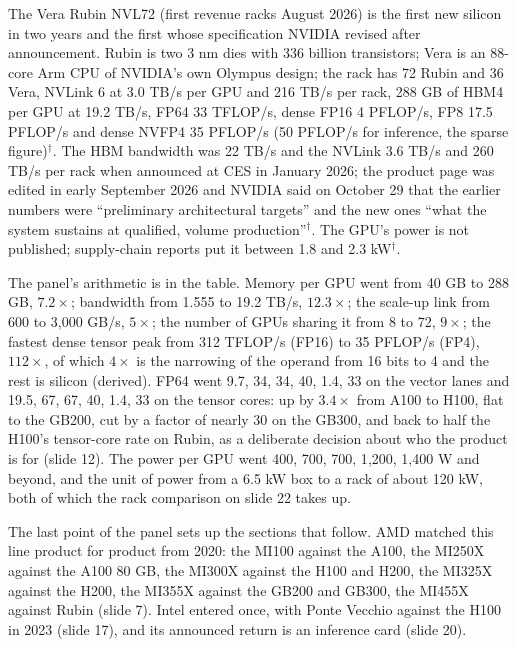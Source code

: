 \documentclass[11pt,letterpaper]{article}
\begin{document}
The Vera Rubin NVL72 (first revenue racks August 2026) is the first new silicon in two years and the first whose specification NVIDIA revised after announcement. Rubin is two 3 nm dies with 336 billion transistors; Vera is an 88-core Arm CPU of NVIDIA's own Olympus design; the rack has 72 Rubin and 36 Vera, NVLink 6 at 3.0 TB/s per GPU and 216 TB/s per rack, 288 GB of HBM4 per GPU at 19.2 TB/s, FP64 33 TFLOP/s, dense FP16 4 PFLOP/s, FP8 17.5 PFLOP/s and dense NVFP4 35 PFLOP/s (50 PFLOP/s for inference, the sparse figure)$^\dagger$. The HBM bandwidth was 22 TB/s and the NVLink 3.6 TB/s and 260 TB/s per rack when announced at CES in January 2026; the product page was edited in early September 2026 and NVIDIA said on October 29 that the earlier numbers were ``preliminary architectural targets'' and the new ones ``what the system sustains at qualified, volume production''$^\dagger$. The GPU's power is not published; supply-chain reports put it between 1.8 and 2.3 kW$^\dagger$.

The panel's arithmetic is in the table. Memory per GPU went from 40 GB to 288 GB, $7.2\times$; bandwidth from 1.555 to 19.2 TB/s, $12.3\times$; the scale-up link from 600 to 3{,}000 GB/s, $5\times$; the number of GPUs sharing it from 8 to 72, $9\times$; the fastest dense tensor peak from 312 TFLOP/s (FP16) to 35 PFLOP/s (FP4), $112\times$, of which $4\times$ is the narrowing of the operand from 16 bits to 4 and the rest is silicon (derived). FP64 went 9.7, 34, 34, 40, 1.4, 33 on the vector lanes and 19.5, 67, 67, 40, 1.4, 33 on the tensor cores: up by $3.4\times$ from A100 to H100, flat to the GB200, cut by a factor of nearly 30 on the GB300, and back to half the H100's tensor-core rate on Rubin, as a deliberate decision about who the product is for (slide 12). The power per GPU went 400, 700, 700, 1{,}200, 1{,}400 W and beyond, and the unit of power from a 6.5 kW box to a rack of about 120 kW, both of which the rack comparison on slide 22 takes up.

The last point of the panel sets up the sections that follow. AMD matched this line product for product from 2020: the MI100 against the A100, the MI250X against the A100 80 GB, the MI300X against the H100 and H200, the MI325X against the H200, the MI355X against the GB200 and GB300, the MI455X against Rubin (slide 7). Intel entered once, with Ponte Vecchio against the H100 in 2023 (slide 17), and its announced return is an inference card (slide 20).
\end{document}
